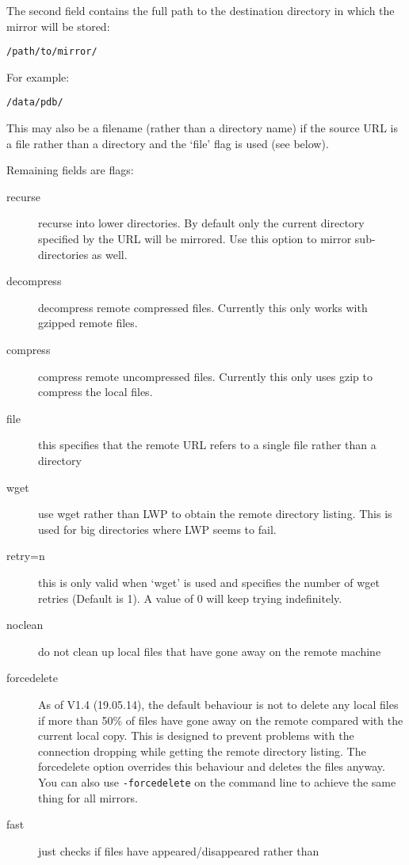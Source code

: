 \documentclass{article}
\begin{document}
The second field contains the full path to the destination directory
in which the mirror will be stored:
\begin{verbatim}
/path/to/mirror/
\end{verbatim}
For example:
\begin{verbatim}
/data/pdb/
\end{verbatim}
This may also be a filename (rather than a directory name) if the
source URL is a file rather than a directory and the `file' flag is
used (see below).

Remaining fields are flags:
\begin{description}
\item[recurse]    recurse into lower directories. By default only the
  current directory specified by the URL will be mirrored. Use this
  option to mirror sub-directories as well.
\item[decompress] decompress remote compressed files. Currently this
  only works with gzipped remote files.
\item[compress]   compress remote uncompressed files. Currently this
  only uses gzip to compress the local files.
\item[file]       this specifies that the remote URL refers to a
  single file rather than a directory
\item[wget]       use wget rather than LWP to obtain the remote
  directory listing. This is used for big directories where LWP seems
  to fail.
\item[retry=n]    this is only valid when `wget' is used and specifies
                  the number of wget retries (Default is 1).
                  A value of 0 will keep trying indefinitely.
\item[noclean]    do not clean up local files that have gone away on the
                  remote machine
\item[forcedelete] As of V1.4 (19.05.14), the default behaviour is not
                   to delete any local files if more than 50\% of
                   files have gone away on the remote compared with
                   the current local copy. This is designed to prevent
                   problems with the connection dropping while getting
                   the remote directory listing. The forcedelete
                   option overrides this behaviour and deletes the
                   files anyway. You can also use \verb|-forcedelete|
                   on the command line to achieve the same thing for
                   all mirrors.
\item[fast] just checks if files have appeared/disappeared rather than

\end{description}
\end{document}
